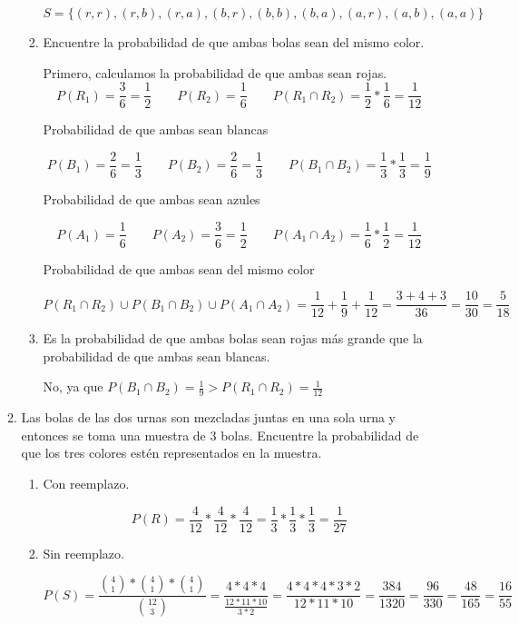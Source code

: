 \documentclass[letterpaper,11pt]{article}
\renewcommand{%
	\contentsname}{\vspace{-1cm} \hfill\bfseries\LARGE Índice \hfill \vspace{0.2cm}%
}
\begin{document}
\begin{enumerate}
\begin{enumerate}
\begin{enumerate}
		$$
		S=\{ (r,r), (r,b), (r,a), (b,r), (b,b), (b,a), (a,r), (a,b), (a,a) \}
		$$

		\item Encuentre la probabilidad de que ambas bolas sean del mismo color.
		
		Primero, calculamos la probabilidad de que ambas sean rojas. 
		$$P(R_1)= \frac{3}{6} = \frac{1}{2} \qquad P(R_2) = \frac{1}{6} \qquad P(R_1 \cap R_2)= \frac{1}{2} * \frac{1}{6} = \frac{1}{12} $$

		Probabilidad de que ambas sean blancas

		$$P(B_1)= \frac{2}{6} = \frac{1}{3} \qquad P(B_2) = \frac{2}{6}= \frac{1}{3} \qquad P(B_1 \cap B_2)= \frac{1}{3} * \frac{1}{3} = \frac{1}{9} $$

		Probabilidad de que ambas sean azules

		$$P(A_1)= \frac{1}{6} \qquad P(A_2) = \frac{3}{6}= \frac{1}{2} \qquad P(A_1 \cap A_2)= \frac{1}{6} * \frac{1}{2} = \frac{1}{12} $$

		Probabilidad de que ambas sean del mismo color 

		$$P(R_1 \cap R_2) \cup P(B_1 \cap B_2) \cup P(A_1 \cap A_2) = \frac{1}{12} + \frac{1}{9} + \frac{1}{12}= \frac{3+4+3}{36} = \frac{10}{30} = \frac{5}{18}$$

		\item Es la probabilidad de que ambas bolas sean rojas más grande que la probabilidad de que ambas sean blancas.
		
		No, ya que $P(B_1 \cap B_2) = \frac{1}{9} > P(R_1 \cap R_2) = \frac{1}{12}$

	\end{enumerate}
	\item Las bolas de las dos urnas son mezcladas juntas en una sola urna y entonces se toma una muestra de 3 bolas. Encuentre la probabilidad de que los tres colores estén representados en la muestra. 
	\begin{enumerate}
		\item Con reemplazo.
		
		$$
		P(R) = \frac{4}{12} * \frac{4}{12} * \frac{4}{12} = \frac{1}{3} * \frac{1}{3} * \frac{1}{3} = \frac{1}{27}
		$$

		\item Sin reemplazo.
		
		$$
		P(S) = \frac{ {4 \choose 1} * {4 \choose 1} * {4 \choose 1} }{ {12 \choose 3} } = \frac{4*4*4}{\frac{12*11*10}{3*2}} = \frac{4*4*4*3*2}{12*11*10} = \frac{384}{1320} = \frac{96}{330} = \frac{48}{165} = \frac{16}{55}
		$$
	\end{enumerate}
\end{enumerate}



\end{enumerate}
\end{document}
